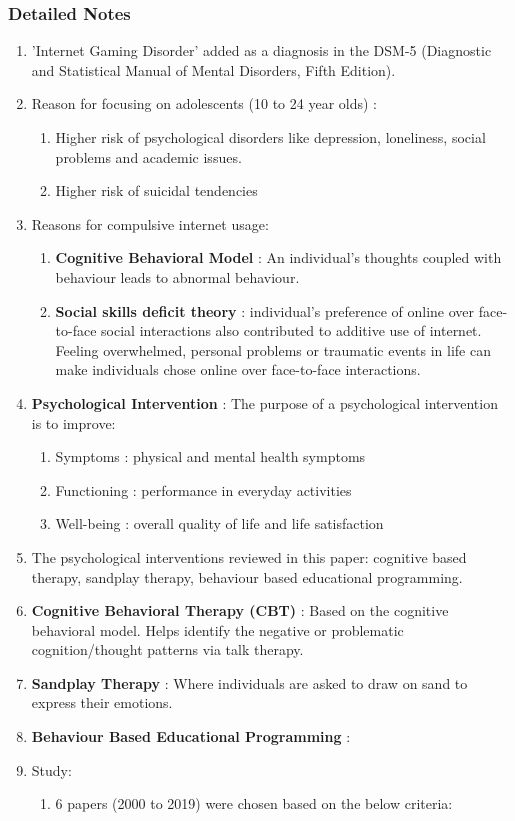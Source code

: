 \documentclass{article}
\begin{document}
\subsubsection{Detailed Notes}
\begin{enumerate}
    \item 'Internet Gaming Disorder' added as a diagnosis in the DSM-5 (Diagnostic and Statistical Manual of Mental Disorders, Fifth Edition).
    \item Reason for focusing on adolescents (10 to 24 year olds) : 
    \begin{enumerate}
        \item Higher risk of psychological disorders like depression, loneliness, social problems and academic issues.
        \item Higher risk of suicidal tendencies
    \end{enumerate}
    \item Reasons for compulsive internet usage:
    \begin{enumerate}
        \item \textbf{Cognitive Behavioral Model} : An individual's thoughts coupled with behaviour leads to abnormal behaviour.
        \item \textbf{Social skills deficit theory} : individual's preference of online over face-to-face social interactions also contributed to additive use of internet. 
        Feeling overwhelmed, personal problems or traumatic events in life can make individuals chose online over face-to-face interactions.
    \end{enumerate}
    \item \textbf{Psychological Intervention} : The purpose of a psychological intervention is to improve:
    \begin{enumerate}
        \item Symptoms : physical and mental health symptoms
        \item Functioning : performance in everyday activities
        \item Well-being : overall quality of life and life satisfaction
    \end{enumerate}
    \item The psychological interventions reviewed in this paper: cognitive based therapy, sandplay therapy, behaviour based educational programming.
    \item \textbf{Cognitive Behavioral Therapy (CBT)} : Based on the cognitive behavioral model. Helps identify the negative or problematic cognition/thought patterns via talk therapy. 
    \item \textbf{Sandplay Therapy} : Where individuals are asked to draw on sand to express their emotions.
    \item \textbf{Behaviour Based Educational Programming} : 
    \item Study:
    \begin{enumerate}
        \item 6 papers (2000 to 2019) were chosen based on the below criteria:
        

\end{enumerate}
\end{enumerate}
\end{document}
